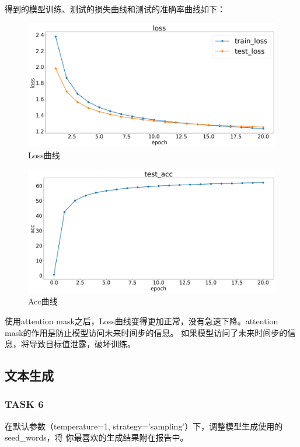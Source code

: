 \documentclass{article}%
\begin{document}
得到的模型训练、测试的损失曲线和测试的准确率曲线如下：
\begin{figure}[H]
    \centering
    \includegraphics[width=0.9\linewidth]{../exp_task5/figs/loss.png}
    \caption{Loss曲线}
\end{figure}
\begin{figure}[H]
    \centering
    \includegraphics[width=0.9\linewidth]{../exp_task5/figs/test_acc.png}
    \caption{Acc曲线}
\end{figure}

使用attention mask之后，Loss曲线变得更加正常，没有急速下降。attention mask的作用是防止模型访问未来时间步的信息。
如果模型访问了未来时间步的信息，将导致目标值泄露，破坏训练。

\subsection{文本生成}
\subsubsection{TASK 6}
在默认参数（temperature=1, strategy='sampling'）下，调整模型生成使用的seed\_words，将
你最喜欢的生成结果附在报告中。
\end{document}
